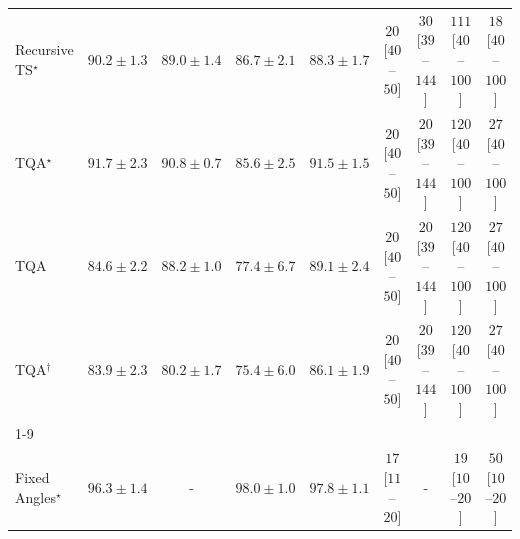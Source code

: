 \begin{tabular}{l|cccc|cccc|}
Recursive TS$^\star$ & {\cellcolor[HTML]{0C723B}} \color[HTML]{F1F1F1} $90.2\pm 1.3$ & {\cellcolor[HTML]{13773D}} \color[HTML]{F1F1F1} $89.0\pm 1.4$ & {\cellcolor[HTML]{218242}} \color[HTML]{F1F1F1} $86.7\pm 2.1$ & {\cellcolor[HTML]{177B3F}} \color[HTML]{F1F1F1} $88.3\pm 1.7$ & {\cellcolor[HTML]{FFF4F0}} \color[HTML]{000000} $20$ [$40$--$50$] & {\cellcolor[HTML]{FFF2EE}} \color[HTML]{000000} $30$ [$39$--$144$] & {\cellcolor[HTML]{FDDEDB}} \color[HTML]{000000} $111$ [$40$--$100$] & {\cellcolor[HTML]{FFF5F1}} \color[HTML]{000000} $18$ [$40$--$100$] \\
TQA$^\star$ & {\cellcolor[HTML]{026A38}} \color[HTML]{F1F1F1} $91.7\pm 2.3$ & {\cellcolor[HTML]{086E3A}} \color[HTML]{F1F1F1} $90.8\pm 0.7$ & {\cellcolor[HTML]{278946}} \color[HTML]{F1F1F1} $85.6\pm 2.5$ & {\cellcolor[HTML]{056C39}} \color[HTML]{F1F1F1} $91.5\pm 1.5$ & {\cellcolor[HTML]{FFF4F0}} \color[HTML]{000000} $20$ [$40$--$50$] & {\cellcolor[HTML]{FFF4F0}} \color[HTML]{000000} $20$ [$39$--$144$] & {\cellcolor[HTML]{FDDCD8}} \color[HTML]{000000} $120$ [$40$--$100$] & {\cellcolor[HTML]{FFF3EF}} \color[HTML]{000000} $27$ [$40$--$100$] \\
TQA & {\cellcolor[HTML]{2D914B}} \color[HTML]{F1F1F1} $84.6\pm 2.2$ & {\cellcolor[HTML]{187B3F}} \color[HTML]{F1F1F1} $88.2\pm 1.0$ & {\cellcolor[HTML]{61BB6D}} \color[HTML]{F1F1F1} $77.4\pm 6.7$ & {\cellcolor[HTML]{13773D}} \color[HTML]{F1F1F1} $89.1\pm 2.4$ & {\cellcolor[HTML]{FFF4F0}} \color[HTML]{000000} $20$ [$40$--$50$] & {\cellcolor[HTML]{FFF4F0}} \color[HTML]{000000} $20$ [$39$--$144$] & {\cellcolor[HTML]{FDDCD8}} \color[HTML]{000000} $120$ [$40$--$100$] & {\cellcolor[HTML]{FFF3EF}} \color[HTML]{000000} $27$ [$40$--$100$] \\
TQA$^\dagger$ & {\cellcolor[HTML]{30954F}} \color[HTML]{F1F1F1} $83.9\pm 2.3$ & {\cellcolor[HTML]{45AD5F}} \color[HTML]{F1F1F1} $80.2\pm 1.7$ & {\cellcolor[HTML]{74C477}} \color[HTML]{000000} $75.4\pm 6.0$ & {\cellcolor[HTML]{258745}} \color[HTML]{F1F1F1} $86.1\pm 1.9$ & {\cellcolor[HTML]{FFF4F0}} \color[HTML]{000000} $20$ [$40$--$50$] & {\cellcolor[HTML]{FFF4F0}} \color[HTML]{000000} $20$ [$39$--$144$] & {\cellcolor[HTML]{FDDCD8}} \color[HTML]{000000} $120$ [$40$--$100$] & {\cellcolor[HTML]{FFF3EF}} \color[HTML]{000000} $27$ [$40$--$100$] \\
\cline{1-9}
\multicolumn{9}{c}{\rule{0pt}{8pt}SV} \\
\midrule
Fixed Angles$^\star$ & {\cellcolor[HTML]{034267}} \color[HTML]{F1F1F1} $96.3\pm 1.4$ & {\cellcolor[HTML]{000000}} \color[HTML]{F1F1F1} {\cellcolor{white}} \color{black} - & {\cellcolor[HTML]{023858}} \color[HTML]{F1F1F1} $98.0\pm 1.0$ & {\cellcolor[HTML]{02395A}} \color[HTML]{F1F1F1} $97.8\pm 1.1$ & {\cellcolor[HTML]{FFF5F1}} \color[HTML]{000000} $17$ [$11$--$20$] & {\cellcolor[HTML]{000000}} \color[HTML]{F1F1F1} {\cellcolor{white}} \color{black} - & {\cellcolor[HTML]{FFF5F1}} \color[HTML]{000000} $19$ [$10$--$20$] & {\cellcolor[HTML]{FEEDE9}} \color[HTML]{000000} $50$ [$10$--$20$] \\

\end{tabular}
